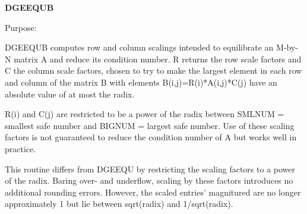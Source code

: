 {\bfseries D\+G\+E\+E\+Q\+U\+B} 

 \begin{DoxyParagraph}{Purpose\+: }
\begin{DoxyVerb} DGEEQUB computes row and column scalings intended to equilibrate an
 M-by-N matrix A and reduce its condition number.  R returns the row
 scale factors and C the column scale factors, chosen to try to make
 the largest element in each row and column of the matrix B with
 elements B(i,j)=R(i)*A(i,j)*C(j) have an absolute value of at most
 the radix.

 R(i) and C(j) are restricted to be a power of the radix between
 SMLNUM = smallest safe number and BIGNUM = largest safe number.  Use
 of these scaling factors is not guaranteed to reduce the condition
 number of A but works well in practice.

 This routine differs from DGEEQU by restricting the scaling factors
 to a power of the radix.  Baring over- and underflow, scaling by
 these factors introduces no additional rounding errors.  However, the
 scaled entries' magnitured are no longer approximately 1 but lie
 between sqrt(radix) and 1/sqrt(radix).\end{DoxyVerb}
 
\end{DoxyParagraph}

